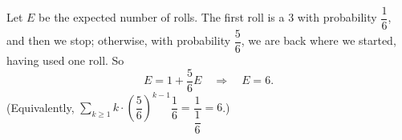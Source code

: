 Let $E$ be the expected number of rolls. The first roll is a $3$ with probability $\dfrac{1}{6}$, and then we stop; otherwise, with probability $\dfrac{5}{6}$, we are back where we started, having used one roll. So
\[
E=1+\dfrac{5}{6}E\quad\Longrightarrow\quad E=\boxed{6}.
\]
(Equivalently, $\sum_{k\ge1}k\cdot\left(\dfrac{5}{6}\right)^{k-1}\dfrac{1}{6}=\dfrac{1}{\dfrac{1}{6}}=6$.)

